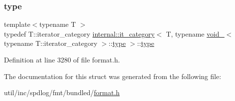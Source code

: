 \subsubsection{\texorpdfstring{type}{type}}
{\footnotesize\ttfamily template$<$typename T $>$ \\
typedef T\+::iterator\+\_\+category \hyperlink{structinternal_1_1it__category}{internal\+::it\+\_\+category}$<$ T, typename \hyperlink{structinternal_1_1void__}{void\+\_\+}$<$ typename T\+::iterator\+\_\+category $>$\+::\hyperlink{structinternal_1_1it__category_3_01_t_00_01typename_01void___3_01typename_01_t_1_1iterator__category_01_4_1_1type_01_4_a3e5e3f4c205fb38b9a49c2205c62e336}{type} $>$\+::\hyperlink{structinternal_1_1it__category_3_01_t_00_01typename_01void___3_01typename_01_t_1_1iterator__category_01_4_1_1type_01_4_a3e5e3f4c205fb38b9a49c2205c62e336}{type}}



Definition at line 3280 of file format.\+h.



The documentation for this struct was generated from the following file\+:\begin{DoxyCompactItemize}
\item 
util/inc/spdlog/fmt/bundled/\hyperlink{format_8h}{format.\+h}\end{DoxyCompactItemize}
